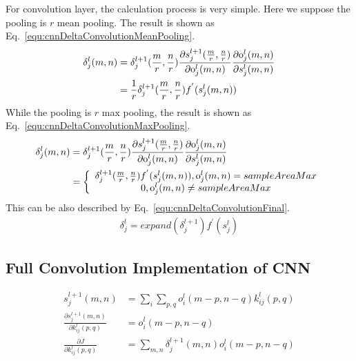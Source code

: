 \documentclass[runningheads,openany]{xhlPaper}
\begin{document}
For convolution layer, the calculation process is very simple. Here we suppose the pooling is $r$ mean pooling. The result is shown as Eq.~\ref{equ:cnnDeltaConvolutionMeanPooling}.
\begin{equation}
\label{equ:cnnDeltaConvolutionMeanPooling}
\begin{aligned}
\delta _j^l(m,n) &= \delta _j^{l + 1}(\frac{m}{r},\frac{n}{r})\frac{{\partial s_j^{l + 1}(\frac{m}{r},\frac{n}{r})}}{{\partial {\rm{o}}_j^l(m,n)}}\frac{{\partial {\rm{o}}_j^l(m,n)}}{{\partial s_j^l(m,n)}}\\
&= \frac{1}{r}\delta _j^{l + 1}(\frac{m}{r},\frac{n}{r})f^{'}{(s^{l}_{j}(m,n))}
\end{aligned}
\end{equation}
While the pooling is $r$ max pooling, the result is shown as Eq.~\ref{equ:cnnDeltaConvolutionMaxPooling}.
\begin{equation}
\label{equ:cnnDeltaConvolutionMaxPooling}
\begin{aligned}
\delta _j^l(m,n) &= \delta _j^{l + 1}(\frac{m}{r},\frac{n}{r})\frac{{\partial s_j^{l + 1}(\frac{m}{r},\frac{n}{r})}}{{\partial {\rm{o}}_j^l(m,n)}}\frac{{\partial {\rm{o}}_j^l(m,n)}}{{\partial s_j^l(m,n)}}\\
&= \left\{ {\begin{array}{*{20}{c}}
{\delta _j^{l + 1}(\frac{m}{r},\frac{n}{r})f^{'}{(s^{l}_{j}(m,n))},{\rm{o}}_j^l(m,n) = sampleAreaMax}\\
{0,{\rm{o}}_j^l(m,n) \ne sampleAreaMax}
\end{array}} \right.
\end{aligned}
\end{equation}
This can be also described by Eq.~\ref{equ:cnnDeltaConvolutionFinal}.
\begin{equation}
\label{equ:cnnDeltaConvolutionFinal}
\begin{aligned}
\delta _j^l = expand(\delta _j^{l + 1})f^{'}{(s^{l}_j)}
\end{aligned}
\end{equation}

\subsection{Full Convolution Implementation of CNN}
\label{sec:cnn_full_convolution_feedforwad}

\begin{displaymath}
\begin{aligned}
s_j^{l + 1}(m,n) &= \sum\limits_i {\sum\limits_{p,q} {o_i^l(m - p,n - q)k_{ij}^l(p,q)} }\\
\frac{{\partial s_j^{l + 1}(m,n)}}{{\partial k_{ij}^{l}(p,q)}}&=o_i^l(m - p,n - q)\\
\frac{{\partial J}}{{\partial k_{ij}^l(p,q)}}&=\sum\limits_{m,n} {\delta _j^{l + 1}(m,n)o_i^l(m - p,n - q)}
\end{aligned}
\end{displaymath}
\end{document}
